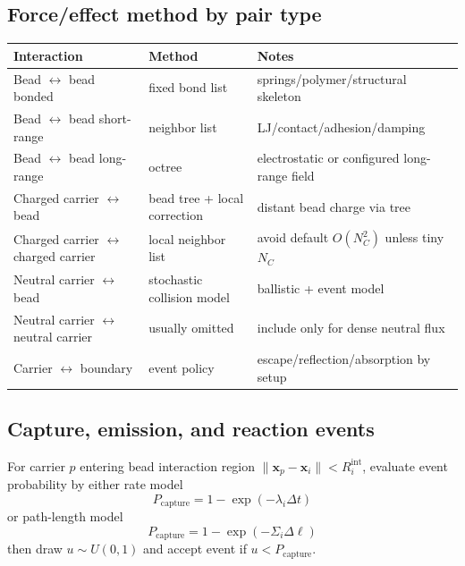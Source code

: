 \documentclass[11pt, a4paper, oneside]{article}
\begin{document}
\subsection{Force/effect method by pair type}

\begin{center}
\begin{tabularx}{\linewidth}{l l X}
\toprule
Interaction & Method & Notes \\
\midrule
Bead $\leftrightarrow$ bead bonded & fixed bond list & springs/polymer/structural skeleton \\
Bead $\leftrightarrow$ bead short-range & neighbor list & LJ/contact/adhesion/damping \\
Bead $\leftrightarrow$ bead long-range & octree & electrostatic or configured long-range field \\
Charged carrier $\leftrightarrow$ bead & bead tree + local correction & distant bead charge via tree \\
Charged carrier $\leftrightarrow$ charged carrier & local neighbor list & avoid default $O(N_C^2)$ unless tiny $N_C$ \\
Neutral carrier $\leftrightarrow$ bead & stochastic collision model & ballistic + event model \\
Neutral carrier $\leftrightarrow$ neutral carrier & usually omitted & include only for dense neutral flux \\
Carrier $\leftrightarrow$ boundary & event policy & escape/reflection/absorption by setup \\
\bottomrule
\end{tabularx}
\end{center}

\subsection{Capture, emission, and reaction events}

For carrier $p$ entering bead interaction region
$\|\mathbf{x}_p-\mathbf{x}_i\|<R_i^{\mathrm{int}}$,
evaluate event probability by either rate model
\begin{equation}
P_{\mathrm{capture}}=1-\exp(-\lambda_i\Delta t)
\end{equation}
or path-length model
\begin{equation}
P_{\mathrm{capture}}=1-\exp(-\Sigma_i\Delta\ell)
\end{equation}
then draw $u\sim U(0,1)$ and accept event if $u<P_{\mathrm{capture}}$.
\end{document}
